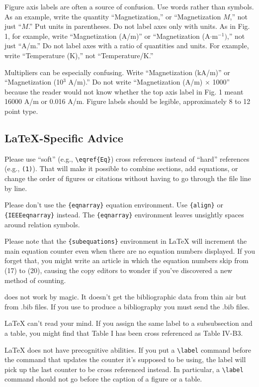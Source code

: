 Figure axis labels are often a source of confusion. Use words rather than 
symbols. As an example, write the quantity ``Magnetization,'' or 
``Magnetization $M$,'' not just ``$M$.'' Put units in parentheses. Do not label 
axes only with units. As in Fig. 1, for example, write ``Magnetization 
(A/m)'' or ``Magnetization (A$\cdot $m$^{-1})$,'' not just ``A/m.'' Do not 
label axes with a ratio of quantities and units. For example, write 
``Temperature (K),'' not ``Temperature/K.'' 

Multipliers can be especially confusing. Write ``Magnetization (kA/m)'' or 
``Magnetization (10$^{3}$ A/m).'' Do not write ``Magnetization (A/m) 
$\times$ 1000'' because the reader would not know whether the top axis 
label in Fig. 1 meant 16000 A/m or 0.016 A/m. Figure labels should be 
legible, approximately 8 to 12 point type.

\subsection{\LaTeX-Specific Advice}

Please use ``soft'' (e.g., \verb|\eqref{Eq}|) cross references instead
of ``hard'' references (e.g., \verb|(1)|). That will make it possible
to combine sections, add equations, or change the order of figures or
citations without having to go through the file line by line.

Please don't use the \verb|{eqnarray}| equation environment. Use
\verb|{align}| or \verb|{IEEEeqnarray}| instead. The \verb|{eqnarray}|
environment leaves unsightly spaces around relation symbols.

Please note that the \verb|{subequations}| environment in {\LaTeX}
will increment the main equation counter even when there are no
equation numbers displayed. If you forget that, you might write an
article in which the equation numbers skip from (17) to (20), causing
the copy editors to wonder if you've discovered a new method of
counting.

{\BibTeX} does not work by magic. It doesn't get the bibliographic
data from thin air but from .bib files. If you use {\BibTeX} to produce a
bibliography you must send the .bib files. 

{\LaTeX} can't read your mind. If you assign the same label to a
subsubsection and a table, you might find that Table I has been cross
referenced as Table IV-B3. 

{\LaTeX} does not have precognitive abilities. If you put a
\verb|\label| command before the command that updates the counter it's
supposed to be using, the label will pick up the last counter to be
cross referenced instead. In particular, a \verb|\label| command
should not go before the caption of a figure or a table.


